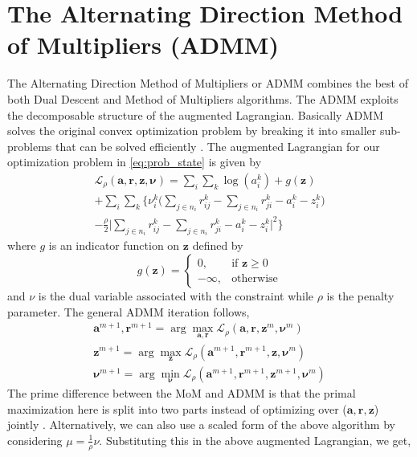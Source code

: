 \documentclass[lettersize,journal]{IEEEtran}
\begin{document}
\section{The Alternating Direction Method of Multipliers (ADMM)} \label{sec:admm}
The Alternating Direction Method of Multipliers or ADMM combines the best of both Dual Descent and Method of Multipliers algorithms. The ADMM exploits the decomposable structure of the augmented Lagrangian. Basically ADMM solves the original convex optimization problem by breaking it into smaller sub-problems that can be solved efficiently \cite{su2022distributed, chatzipanagiotis2017convergence, bertsekas2015parallel}. The augmented Lagrangian for our optimization problem in \eqref{eq:prob_state} is given by 
\begin{multline} \label{aug_lag_admm1}
    \mathcal{L}_{\rho} (\bm{a}, \bm{r}, \bm{z}, \bm{\nu}) = \sum_i \sum_k \log ( a_i^k ) + g(\bm{z})\\
    + \sum_i \sum_k \Bigg\{ \nu_i^k \Bigg( \sum_{j \in n_i} r_{ij}^k - \sum_{j \in n_i} r_{ji}^k - a_i^k - z_i^k \Bigg) \\
    - \frac{\rho}{2} \Bigg| \sum_{j \in n_i} r_{ij}^k - \sum_{j \in n_i} r_{ji}^k - a_i^k - z_i^k \Bigg|^2 \Bigg\}
\end{multline}
where $g$ is an indicator function on $\bm{z}$ defined by
\begin{equation} \label{eq:indicator}
    g(\bm{z}) = 
    \begin{cases}
    0, & \text{if } \bm{z} \geq 0 \\
    - \infty, & \text{otherwise}
    \end{cases}
\end{equation}
and $\nu$ is the dual variable associated with the constraint while $\rho$ is the penalty parameter. The general ADMM iteration follows,
\begin{subequations}
    \begin{align}
        \bm{a}^{m+1}, \bm{r}^{m+1} = \arg \max_{\bm{a}, \bm{r}} \mathcal{L}_{\rho} (\bm{a}, \bm{r}, \bm{z}^m, \bm{\nu}^m) \\
        \bm{z}^{m+1} = \arg \max_{\bm{z}} \mathcal{L}_{\rho} (\bm{a}^{m+1}, \bm{r}^{m+1}, \bm{z}, \bm{\nu}^m) \\
        \bm{\nu}^{m+1} = \arg \min_{\bm{\nu}} \mathcal{L}_{\rho} (\bm{a}^{m+1}, \bm{r}^{m+1}, \bm{z}^{m+1}, \bm{\nu}^m)
    \end{align}
\end{subequations}
The prime difference between the MoM and ADMM is that the primal maximization here is split into two parts instead of optimizing over ($\bm{a},\bm{r},\bm{z}$) jointly \cite{boyd2011distributed}. %
Alternatively, we can also use a scaled form of the above algorithm by considering $\mu = \frac{1}{\rho}\nu$. Substituting this in the above augmented Lagrangian, we get, 
\end{document}
